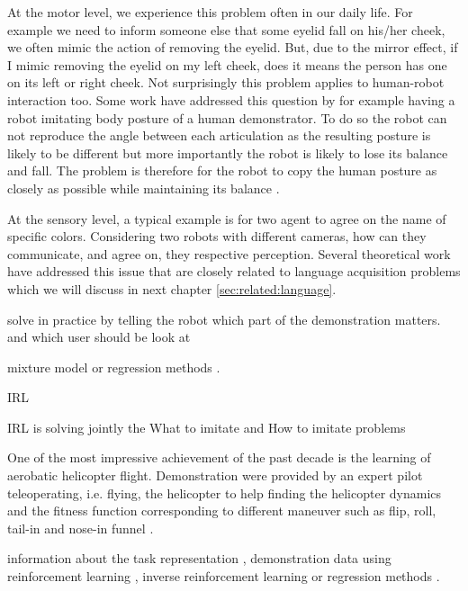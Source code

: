\begin{itemize}
At the motor level, we experience this problem often in our daily life. For example we need to inform someone else that some eyelid fall on his/her cheek, we often mimic the action of removing the eyelid. But, due to the mirror effect, if I mimic removing the eyelid on my left cheek, does it means the person has one on its left or right cheek. Not surprisingly this problem applies to human-robot interaction too. Some work have addressed this question by for example having a robot imitating body posture of a human demonstrator. To do so the robot can not reproduce the angle between each articulation as the resulting posture is likely to be different but more importantly the robot is likely to lose its balance and fall. The problem is therefore for the robot to copy the human posture as closely as possible while maintaining its balance \cite{hyon2007full,yamane2009simultaneous}. 

At the sensory level, a typical example is for two agent to agree on the name of specific colors. Considering two robots with different cameras, how can they communicate, and agree on, they respective perception. Several theoretical work have addressed this issue \cite{cangelosi2001adaptive,steels2005coordinating} that are closely related to language acquisition problems which we will discuss in next chapter \ref{sec:related:language}.

\end{itemize}

solve in practice by telling the robot which part of the demonstration matters. and which user should be look at

mixture model \cite{calinon07} 
or regression methods \cite{calinon07,chernova09jair}.

IRL \cite{Abbeel04icml} 

IRL is solving jointly the What to imitate and How to imitate problems

One of the most impressive achievement of the past decade is the learning of aerobatic helicopter flight. Demonstration were provided by an expert pilot teleoperating, i.e. flying, the helicopter to help finding the helicopter dynamics and the fitness function corresponding to different maneuver such as flip, roll, tail-in and nose-in funnel \cite{abbeel2007application}.

information about the task representation \cite{macl07affimit},
demonstration data using reinforcement learning \cite{thomaz2008teachable}, inverse reinforcement learning \cite{macl07affimit,Abbeel04icml} or regression methods \cite{calinon07,chernova09jair}.

